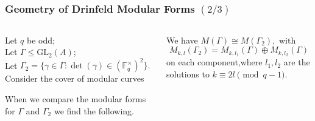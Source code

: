 \documentclass{beamer}
\numberwithin{equation}{section}
\numberwithin{case}{theorem}
\newcommand{\sX}{\mathscr{X}}		%
\newcommand{\bbF}{\mathbb{F}}		%
\newcommand{\GL}{\mathrm{GL}} 	%
\newcommand{\<}{\left\langle}
\renewcommand{\>}{\right\rangle}
\begin{document}
\begin{frame}
	\frametitle{Geometry of Drinfeld Modular Forms $(2/3)$}
	\begin{columns} 
		\begin{column}{.5\textwidth}
			Let $q$ be odd;\\
			Let $\Gamma\leq \GL_2(A)$;\\ 
			Let $\Gamma_2=\{\gamma\in \Gamma:\det(\gamma)\in (\bbF_q^{\times})^2\}.$\\
			Consider the cover of modular curves\\
			\begin{figure}[!h]\centering
			\end{figure}\pause
			When we compare the modular forms for $\Gamma$ and $\Gamma_2$ we find the following.
		\end{column}\pause
		\begin{column}{.5\textwidth}
			\begin{theorem}
				We have $M(\Gamma)\cong M(\Gamma_2),$ \pause
				with \[M_{k,l}(\Gamma_2)=M_{k,l_1}(\Gamma)\oplus M_{k,l_2}(\Gamma)\] on each component,\pause where $l_1,l_2$ are the solutions to $k\equiv 2l\pmod{q-1}.$ 
			\end{theorem}
		\end{column}
	\end{columns}
\end{frame}	
\end{document}
